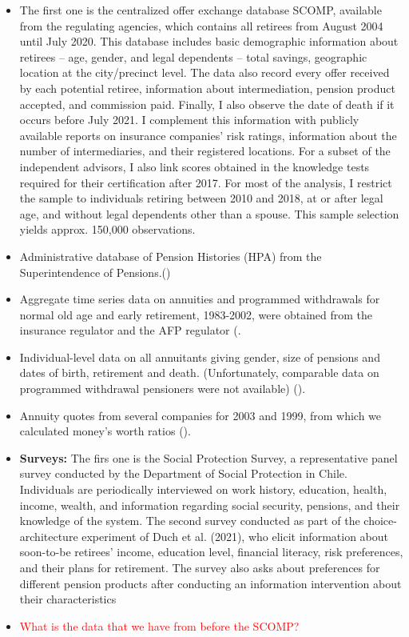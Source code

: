 \documentclass[12pt]{article}
\theoremstyle{plain}
\theoremstyle{plain}
\begin{document}
\begin{itemize}
    \item The first one is the centralized offer exchange database SCOMP, available from the regulating agencies, which contains all retirees from August 2004 until July 2020. This database includes basic demographic information about retirees – age, gender, and legal dependents – total savings, geographic location at the city/precinct level. The data also record every offer received by each potential retiree, information about intermediation, pension product accepted, and commission paid. Finally, I also observe the date of death if it occurs before July 2021. I complement this information with publicly available reports on insurance companies’ risk ratings, information about the number of intermediaries, and their registered locations. For a subset of the independent advisors, I also link scores obtained in the knowledge tests required for their certification after 2017. For most of the analysis, I restrict the sample to individuals retiring between 2010 and 2018, at or after legal age, and without legal dependents other than a spouse. This sample selection yields approx. 150,000 observations.

    \item Administrative database of Pension Histories (HPA) from the Superintendence of Pensions.(\cite{halcartegaray_efectos_2011}) 
    
    \item Aggregate time series data on annuities and programmed withdrawals for normal old age and early retirement, 1983-2002, were obtained from the insurance regulator and the AFP regulator (\cite{james_pensiones_2005}.
    
    \item Individual-level data on all annuitants giving gender, size of pensions and dates of birth, retirement and death. (Unfortunately, comparable data on programmed withdrawal pensioners were not available) (\cite{james_pensiones_2005}). 
    
    \item Annuity quotes from several companies for 2003 and 1999, from which we calculated money’s worth ratios (\cite{james_pensiones_2005}). 


\item \textbf{Surveys: } The firs one is the Social Protection Survey, a representative panel survey conducted by the Department of Social Protection in Chile. Individuals are periodically interviewed on work history, education, health, income, wealth, and information regarding social security, pensions, and their knowledge of the system. The second survey conducted as part of the choice-architecture experiment of Duch et al. (2021), who elicit information about soon-to-be retirees’ income, education level, financial literacy, risk preferences, and their plans for retirement. The survey also asks about preferences for different pension products after conducting an information intervention about their characteristics

\item \textcolor{red}{What is the data that we have from before the SCOMP? }

\end{itemize}
\end{document}
